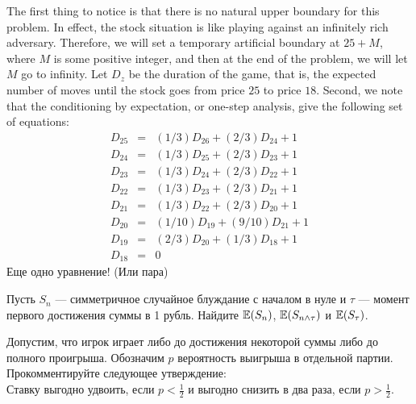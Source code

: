 \begin{problem}
\begin{sol}

The first thing to notice is that there is no natural upper
boundary for this problem. In effect, the stock situation is
like playing against an infinitely rich adversary. Therefore,
we will set a temporary
artificial boundary at $25+M$, where $M$ is some
positive integer, and then at the end of the problem, we will
let $M$ go to infinity. Let $D_z$ be the duration of the game,
that is, the expected number of moves until the stock goes
from price $25$ to price $18$. Second, we note that the
conditioning by expectation, or one-step analysis, give the
following set of equations:
\begin{eqnarray*}
 D_{25} &=& (1/3) D_{26} + (2/3) D_{24} + 1  \\
 D_{24} &=& (1/3) D_{25} + (2/3) D_{23} + 1  \\
 D_{23} &=& (1/3) D_{24} + (2/3) D_{22} + 1  \\
 D_{22} &=& (1/3) D_{23} + (2/3) D_{21} + 1  \\
 D_{21} &=& (1/3) D_{22} + (2/3) D_{20} + 1  \\
 D_{20} &=& (1/10) D_{19} + (9/10) D_{21} + 1  \\
 D_{19} &=& (2/3) D_{20} + (1/3) D_{18} + 1  \\
 D_{18} &=& 0
\end{eqnarray*}
Еще одно уравнение! (Или пара)
\end{sol}
\end{problem}

\begin{problem}
Пусть $S_{n}$ — симметричное случайное блуждание с началом в нуле
и $\tau$ — момент первого достижения суммы в 1 рубль. Найдите
$\mathbb{E}(S_{n})$, $\mathbb{E}(S_{n\wedge \tau})$ и $\mathbb{E}(S_{\tau})$.

\begin{sol}

\end{sol}
\end{problem}

\begin{problem}
Допустим, что игрок играет либо до достижения некоторой суммы либо
до полного проигрыша. Обозначим $p$ вероятность выигрыша в отдельной партии. \\
Прокомментируйте следующее утверждение: \\
Ставку выгодно удвоить, если $p<\frac{1}{2}$ и выгодно снизить в
два раза, если $p>\frac{1}{2}$.

\begin{sol}

\end{sol}
\end{problem}

